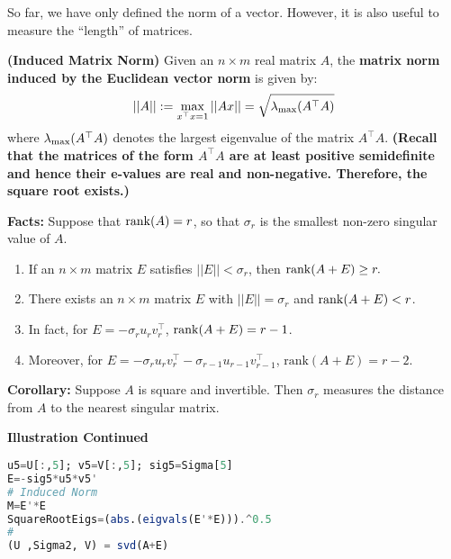 \vspace*{.2cm}

So far, we have only defined the norm of a vector. However, it is also useful to measure the ``length'' of matrices. \\

\begin{definition} \textbf{(Induced Matrix Norm)}
Given an $n \times m$ real matrix  $A$, the \textbf{matrix norm induced by the Euclidean vector norm} is given by:
$$||A|| :=\max_{x^\top x = 1} ||Ax|| = \sqrt{ \lambda_{\rm max}(A^\top A) }$$
where $\lambda_{\rm max}(A^\top A)$ denotes the largest eigenvalue of the matrix $A^\top A$. \textbf{ (Recall that the matrices of the form $A^\top A$ are at least positive semidefinite and hence their e-values are real and non-negative.  Therefore, the square root exists.) }
\end{definition}


\begin{tcolorbox}[title=\textbf{Numerical Rank}]


\textbf{Facts:} Suppose that $\mathrm{rank}(A) = r$, so that $\sigma_r$ is the smallest non-zero singular value of $A$. 

\begin{enumerate}
\setlength{\itemsep}{.1in}
\renewcommand{\labelenumi}{(\roman{enumi})}
\item If an $n \times m$ matrix $E$ satisfies $||E|| < \sigma_r$, then $\mathrm{rank}(A+E)\ge r.$

\item There exists an $n \times m$ matrix $E$ with $||E|| = \sigma_r$ and $\mathrm{rank}(A+E) < r$.

\item In fact, for $E=-\sigma_r u_r v_r^\top$,  $\mathrm{rank}(A+E) =r-1$.

\item Moreover, for $E=-\sigma_r u_r v_r^\top - \sigma_{r-1} u_{r-1} v_{r-1}^\top$,  $\text{rank}(A+E) =r-2$.

\end{enumerate}

\textbf{Corollary:}  Suppose $A$ is square and invertible. Then $\sigma_r$ measures the distance from $A$ to the nearest singular matrix.
\end{tcolorbox}


\textbf{Illustration Continued}

 \begin{lstlisting}[language=Julia]
u5=U[:,5]; v5=V[:,5]; sig5=Sigma[5]
E=-sig5*u5*v5'
# Induced Norm
M=E'*E
SquareRootEigs=(abs.(eigvals(E'*E))).^0.5
#
(U ,Sigma2, V) = svd(A+E)
\end{lstlisting}

